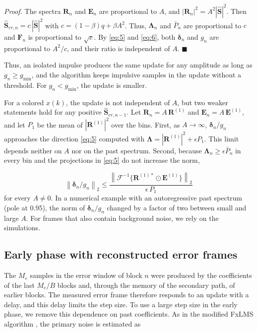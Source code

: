 \documentclass[sip,biber]{now-journal}
\begin{document}
\emph{Proof.} The spectra \(\mathbf{R}_n\) and \(\mathbf{E}_n\) are proportional to \(A\), and \(|\mathbf{R}_n|^2 = A^2|\hat{\mathbf{S}}|^2\). Then \(\hat{\mathbf{S}}_{rr,n} = c\,|\hat{\mathbf{S}}|^2\) with \(c = (1-\beta)q + \beta A^2\). Thus, \(\boldsymbol{\Lambda}_n\) and \(\bar{P}_n\) are proportional to \(c\) and \(\mathbf{F}_n\) is proportional to \(\sqrt{c}\). By \eqref{eq:5} and \eqref{eq:6}, both \(\boldsymbol{\delta}_n\) and \(g_n\) are proportional to \(A^2/c\), and their ratio is independent of \(A\). \(\blacksquare\)

Thus, an isolated impulse produces the same update for any amplitude as long as \(g_n \ge g_{\min}\), and the algorithm keeps impulsive samples in the update without a threshold. For \(g_n < g_{\min}\), the update is smaller.

For a colored \(x(k)\), the update is not independent of \(A\), but two weaker statements hold for any positive \(\hat{\mathbf{S}}_{rr,n-1}\). Let \(\mathbf{R}_n = A\,\mathbf{R}^{(1)}\) and \(\mathbf{E}_n = A\,\mathbf{E}^{(1)}\), and let \(P_1\) be the mean of \(|\mathbf{R}^{(1)}|^2\) over the bins. First, as \(A \to \infty\), \(\boldsymbol{\delta}_n/g_n\) approaches the direction \eqref{eq:5} computed with \(\boldsymbol{\Lambda} = |\mathbf{R}^{(1)}|^2 + \epsilon P_1\). This limit depends neither on \(A\) nor on the past spectrum. Second, because \(\boldsymbol{\Lambda}_n \ge \epsilon \bar{P}_n\) in every bin and the projections in \eqref{eq:5} do not increase the norm,

\[\left\| \boldsymbol{\delta}_n / g_n \right\|_2 \le \frac{\left\| \mathcal{F}^{-1}\{\mathbf{R}^{(1)*} \odot \mathbf{E}^{(1)}\} \right\|_2}{\epsilon\, P_1}\] for every \(A \ne 0\). In a numerical example with an autoregressive past spectrum (pole at 0.95), the norm of \(\boldsymbol{\delta}_n/g_n\) changed by a factor of two between small and large \(A\). For frames that also contain background noise, we rely on the simulations.

\hypertarget{sec:4.4}{%
\subsection{Early phase with reconstructed error frames}\label{sec:4.4}}

The \(M_e\) samples in the error window of block \(n\) were produced by the coefficients of the last \(M_e/B\) blocks and, through the memory of the secondary path, of earlier blocks. The measured error frame therefore responds to an update with a delay, and this delay limits the step size. To use a large step size in the early phase, we remove this dependence on past coefficients. As in the modified FxLMS algorithm \cite{bjarnason1992}, the primary noise is estimated as
\end{document}
